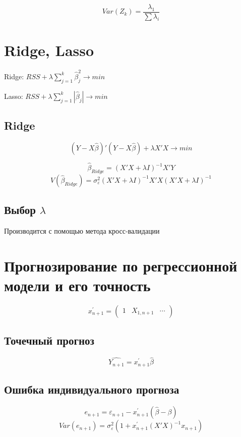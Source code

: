 \documentclass[a4paper, 12pt]{article}
\begin{document}
\[Var(Z_k) = \frac{\lambda_1}{\sum \lambda_i}\]

\section{Ridge, Lasso}

\begin{center}
    Ridge: $RSS + \lambda \sum_{j = 1}^k \hat{\beta}_{j}^2 \rightarrow min$

    Lasso: $RSS + \lambda \sum_{j = 1}^k |\hat{\beta}_{j}| \rightarrow min$        
\end{center}

\subsection{Ridge}

\[(Y - X\hat{\beta})'(Y - X \hat{\beta}) + 
\lambda X'X \rightarrow min\]

\[\hat{\beta}_{Ridge} = (X'X + \lambda I)^{-1}X'Y\]
\[V(\hat{\beta}_{Ridge}) = \sigma_{\varepsilon}^2 
(X'X + \lambda I)^{-1}X'X(X'X + \lambda I)^{-1}\]

\subsection{Выбор $\lambda$}

Производится с помощью метода кросс-валидации

\section{Прогнозирование по регрессионной модели и его точность}

\[x_{n + 1}^{\prime} = 
\begin{pmatrix}
    1 & X_{1, n + 1} & \cdots
\end{pmatrix}\]
\subsection{Точечный прогноз}

\[\hat{Y_{n + 1}} = x_{n + 1}^{\prime}\hat{\beta}\]

\subsection{Ошибка индивидуального прогноза}

\[e_{n + 1} = \varepsilon_{n + 1} - 
x_{n + 1}^{\prime}(\hat{\beta} - \beta)\]
\[Var(e_{n + 1}) = \sigma_{\varepsilon}^2
(1 + x_{n + 1}^{\prime} (X'X)^{-1} x_{n + 1})\]
\end{document}
